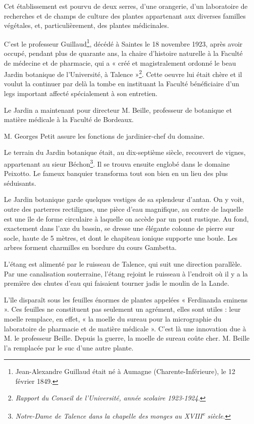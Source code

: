 \documentclass[a4paper,11pt]{book}
\begin{document}
Cet établissement est pourvu de deux serres, d'une orangerie, d'un laboratoire de recherches et de champs de culture des plantes appartenant aux diverses familles végétales, et, particulièrement, des plantes médicinales.

C'est le professeur Guillaud\footnote{Jean-Alexandre Guillaud était né à Aumagne (Charente-Inférieure), le 12 février 1849.}, décédé à Saintes le 18 novembre 1923, après avoir occupé, pendant plus de quarante ans, la chaire d'histoire naturelle à la Faculté de médecine et de pharmacie, qui a « créé et magistralement ordonné le beau Jardin botanique de l'Université, à Talence »\footnote{\textit{Rapport du Conseil de l'Université, année scolaire 1923-1924}.}. Cette oeuvre lui était chère et il voulut la continuer par delà la tombe en instituant la Faculté bénéficiaire d'un legs important affecté spécialement à son entretien.

Le Jardin a maintenant pour directeur M. Beille, professeur de botanique et matière médicale à la Faculté de Bordeaux.

M. Georges Petit assure les fonctions de jardinier-chef du domaine.

Le terrain du Jardin botanique était, au dix-septième siècle, recouvert de vignes, appartenant au sieur Béchon\footnote{\textit{Notre-Dame de Talence dans la chapelle des monges au XVIII\textsuperscript{e} siècle}.}. Il se trouva ensuite englobé dans le domaine Peixotto. Le fameux banquier transforma tout son bien en un lieu des plus séduisants.

Le Jardin botanique garde quelques vestiges de sa splendeur d'antan. On y voit, outre des parterres rectilignes, une pièce d'eau magnifique, au centre de laquelle est une île de forme circulaire à laquelle on accède par un pont rustique. Au fond, exactement dans l'axe du bassin, se dresse une élégante colonne de pierre sur socle, haute de 5 mètres, et dont le chapiteau ionique supporte une boule. Les arbres forment charmilles en bordure du cours Gambetta.

L'étang est alimenté par le ruisseau de Talence, qui suit une direction parallèle. Par une canalisation souterraine, l'étang rejoint le ruisseau à l'endroit où il y a la première des chutes d'eau qui faisaient tourner jadis le moulin de la Lande.

L'île disparaît sous les feuilles énormes de plantes appelées « Ferdinanda eminens ». Ces feuilles ne constituent pas seulement un agrément, elles sont utiles : leur moelle remplace, en effet, « la moelle du sureau pour la micrographie du laboratoire de pharmacie et de matière médicale ». C'est là une innovation due à M. le professeur Beille. Depuis la guerre, la moelle de sureau coûte cher. M. Beille l'a remplacée par le suc d'une autre plante.
\end{document}

